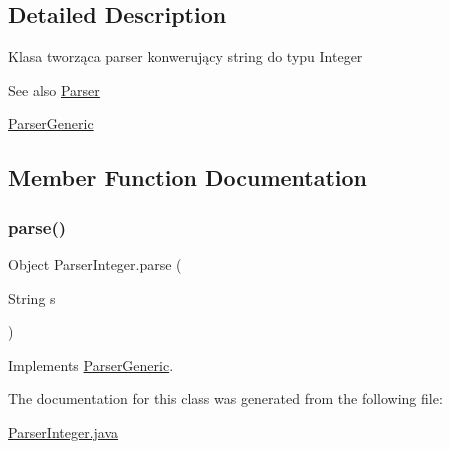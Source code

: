 \subsection{Detailed Description}
Klasa tworząca parser konwerujący string do typu Integer \begin{DoxySeeAlso}{See also}
\hyperlink{classParser}{Parser} 

\hyperlink{interfaceParserGeneric}{Parser\+Generic} 
\end{DoxySeeAlso}


\subsection{Member Function Documentation}
\mbox{\label{classParserInteger_a56a141fdc62fbc8589b4259a0e65cbaa}} 
\subsubsection{\texorpdfstring{parse()}{parse()}}
{\footnotesize\ttfamily Object Parser\+Integer.\+parse (\begin{DoxyParamCaption}\item[{String}]{s }\end{DoxyParamCaption})\hspace{0.3cm}{\ttfamily [inline]}}



Implements \hyperlink{interfaceParserGeneric_a42d671b89e41a5adb31a41c59db57503}{Parser\+Generic}.



The documentation for this class was generated from the following file\+:\begin{DoxyCompactItemize}
\item 
\hyperlink{ParserInteger_8java}{Parser\+Integer.\+java}\end{DoxyCompactItemize}
